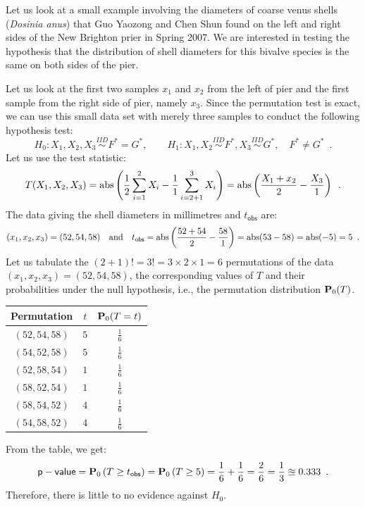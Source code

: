 Let us look at a small example involving the diameters of coarse venus shells ({\em Dosinia anus}) that Guo Yaozong and Chen Shun found on the left and right sides of the New Brighton prier in Spring 2007.  We are interested in testing the hypothesis that the distribution of shell diameters for this bivalve species is the same on both sides of the pier.  
\begin{example}
Let us look at the first two samples $x_1$ and $x_2$ from the left of pier and the first sample from the right side of pier, namely $x_3$.  Since the permutation test is exact, we can use this small data set with merely three samples to conduct the following hypothesis test:
\[
H_0: X_1,X_2,X_3 \overset{IID}{\sim} F^*=G^*, \qquad H_1: X_1,X_2 \overset{IID}{\sim} F^*, X_3 \overset{IID}{\sim} G^*, \quad F^* \neq G^* \enspace .
\] 
Let us use the test statistic:
\[
T(X_1,X_2,X_3)={\mathop{\rm abs}} \left( \frac{1}{2} \sum_{i=1}^2 X_i -  \frac{1}{1} \sum_{i=2+1}^3 X_i  \right)={\mathop{\rm abs}} \left( \frac{X_1+x_2}{2} -  \frac{X_3}{1} \right) \enspace .
\]
The data giving the shell diameters in millimetres and $t_{\mathsf{obs}}$ are:
\[
(x_1,x_2,x_3) = (52,54,58) \quad \text{and} \quad t_{\mathsf{obs}}={\mathop{\rm abs}} \left( \frac{52+54}{2} - \frac{58}{1} \right) = {\mathop{\rm abs}} (53-58) = {\mathop{\rm abs}}(-5)=5 \enspace .
\]
Let us tabulate the $(2+1)!=3!=3\times2\times1=6$ permutations of the data $(x_1,x_2,x_3) = (52,54,58)$, the corresponding values of $T$ and their probabilities under the null hypothesis, i.e., the permutation distribution $\mathbf{P}_0(T)$.
\begin{center}
\begin{tabular}{c c c}
\hline
Permutation & $t$ & $\mathbf{P}_0(T=t)$ \\ \hline
$(52,54,58)$ & $5$ & $\frac{1}{6}$ \\
$(54,52,58)$ & $5$ & $\frac{1}{6}$  \\
$(52,58,54)$ & $1$ & $\frac{1}{6}$  \\
$(58,52,54)$ & $1$ &$\frac{1}{6}$  \\
$(58,54,52)$ & $4$ & $\frac{1}{6}$  \\
$(54,58,52)$ & $4$ & $\frac{1}{6}$  \\ \hline
\end{tabular}
\end{center}
From the table, we get:
\[
\mathsf{p-value} = \mathbf{P}_0 \left( T \geq t_{\mathsf{obs}}\right) =  \mathbf{P}_0 \left( T \geq 5 \right) = \frac{1}{6}+ \frac{1}{6}= \frac{2}{6}= \frac{1}{3} \approxeq 0.333 \enspace . 
\]
Therefore, there is little to no evidence against $H_0$.
\end{example}

